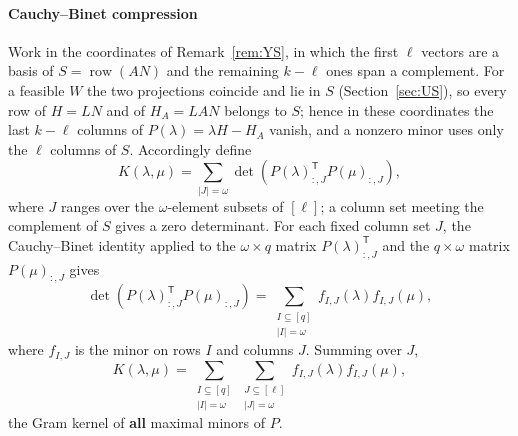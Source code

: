 \documentclass[journal]{IEEEtran}
\theoremstyle{plainn}
\theoremstyle{remark}
\begin{document}
\paragraph*{Cauchy--Binet compression}\label{sec:cb}
Work in the coordinates of Remark~\ref{rem:YS}, in which the first $\ell$ vectors are a basis of
$S=\operatorname{row}(AN)$ and the remaining $k-\ell$ ones span a complement. For a feasible $W$ the
two projections coincide and lie in $S$ (Section~\ref{sec:US}), so every row of $H=LN$ and of
$H_A=LAN$ belongs to $S$; hence in these coordinates the last $k-\ell$ columns of $P(\lambda)=\lambda
H-H_A$ vanish, and a nonzero minor uses only the $\ell$ columns of $S$. Accordingly define
\begin{equation*}
K(\lambda,\mu)=\sum_{|J|=\omega}
\det\left(P(\lambda)_{:,J}^{\mathsf T}P(\mu)_{:,J}\right),
\end{equation*}
where $J$ ranges over the $\omega$-element subsets of $[\ell]$; a column set meeting the
complement of $S$ gives a zero determinant. For each fixed column set $J$, the Cauchy--Binet identity
\cite[Ch.~0]{hj13} applied
to the $\omega\times q$ matrix $P(\lambda)_{:,J}^{\mathsf T}$ and the
$q\times\omega$ matrix $P(\mu)_{:,J}$ gives
\begin{equation*}
\det\!\left(P(\lambda)_{:,J}^{\mathsf T}P(\mu)_{:,J}\right)
=\sum_{\substack{I\subseteq[q]\\ |I|=\omega}}
f_{I,J}(\lambda)f_{I,J}(\mu),
\end{equation*}
where $f_{I,J}$ is the minor on rows $I$ and columns $J$. Summing over $J$,
\begin{equation*}
K(\lambda,\mu)=\sum_{\substack{I\subseteq[q]\\ |I|=\omega}}
\sum_{\substack{J\subseteq[\ell]\\ |J|=\omega}}
f_{I,J}(\lambda)f_{I,J}(\mu),
\end{equation*}
the Gram kernel of \textbf{all} maximal minors of $P$.
\end{document}
